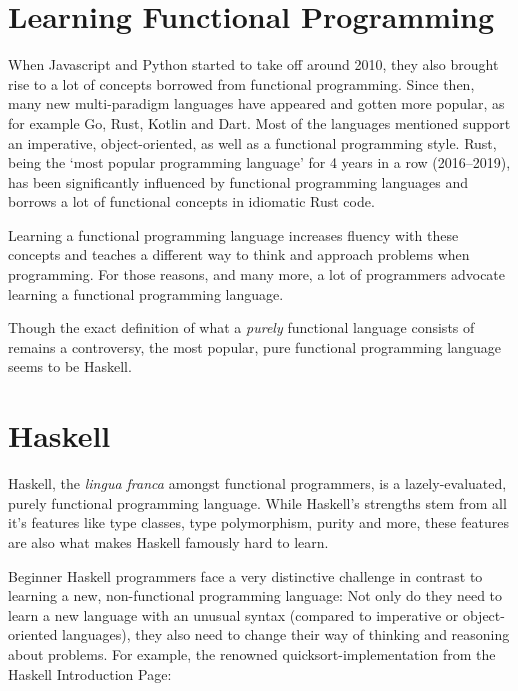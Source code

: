
\section{Learning Functional Programming}
When Javascript and Python started to take off around 2010\autocite{python-popularity},
they also brought rise to a lot of concepts borrowed from functional programming.
Since then, many new multi-paradigm
languages have appeared and gotten more popular, as for example Go, Rust,
Kotlin and Dart.
Most of the languages mentioned support an imperative, object-oriented, as well as a functional programming style.
Rust, being the `most popular programming language'%
for 4 years in a row (2016--2019), has been
significantly influenced by functional programming languages\autocite{rust-functional} and borrows a lot of functional
concepts in idiomatic Rust code.

Learning a functional programming language increases fluency with these concepts and teaches a different
way to think and approach problems when programming. For those reasons, and many more, a lot of programmers
advocate learning a functional programming language.

Though the exact definition of what a \textit{purely} functional language consists of remains a controversy\autocite{functional-controversy},
the most popular, pure functional programming language seems to be Haskell\autocite{comparison-functional-languages}.

\section{Haskell}

Haskell, the \textit{lingua franca} amongst functional programmers, is a lazely-evaluated, purely functional programming
language. While Haskell's strengths stem from all it's features like type classes, type polymorphism, purity and more,
these features are also what makes Haskell famously hard to learn\autocite{haskell-hard-one}\autocite{haskell-hard-two}\autocite{haskell-hard-three}\autocite{haskell-hard-four}.

Beginner Haskell programmers face a very distinctive challenge in contrast to learning a new, non-functional programming language:
Not only do they need to learn a new language with an unusual syntax (compared to imperative or object-oriented languages), they
also need to change their way of thinking and reasoning about problems.
For example, the renowned quicksort-implementation from the Haskell Introduction Page\autocite{haskell-quicksort}:

